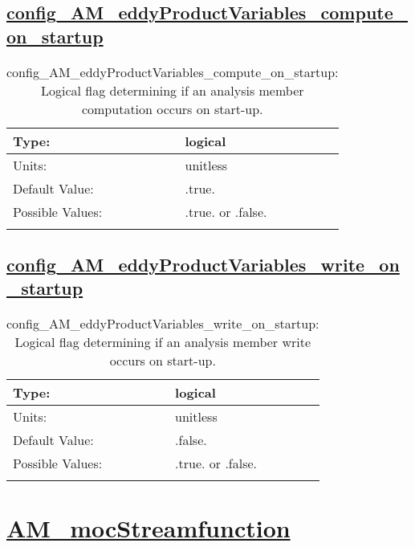 \subsection[config\_AM\_eddyProductVariables\_compute\_on\_startup]{\hyperref[sec:nm_tab_AM_eddyProductVariables]{config\_AM\_eddyProductVariables\_compute\_on\_startup}}
\label{subsec:nm_sec_config_AM_eddyProductVariables_compute_on_startup}
\begin{center}
\begin{longtable}{| p{2.0in} || p{4.0in} |}
    \hline
    Type: & logical \\
    \hline
    Units: & \si{unitless} \\
    \hline
    Default Value: & .true. \\
    \hline
    Possible Values: & .true. or .false. \\
    \hline
    \caption{config\_AM\_eddyProductVariables\_compute\_on\_startup: Logical flag determining if an analysis member computation occurs on start-up.}
\end{longtable}
\end{center}
\subsection[config\_AM\_eddyProductVariables\_write\_on\_startup]{\hyperref[sec:nm_tab_AM_eddyProductVariables]{config\_AM\_eddyProductVariables\_write\_on\_startup}}
\label{subsec:nm_sec_config_AM_eddyProductVariables_write_on_startup}
\begin{center}
\begin{longtable}{| p{2.0in} || p{4.0in} |}
    \hline
    Type: & logical \\
    \hline
    Units: & \si{unitless} \\
    \hline
    Default Value: & .false. \\
    \hline
    Possible Values: & .true. or .false. \\
    \hline
    \caption{config\_AM\_eddyProductVariables\_write\_on\_startup: Logical flag determining if an analysis member write occurs on start-up.}
\end{longtable}
\end{center}
\section[AM\_mocStreamfunction]{\hyperref[sec:nm_tab_AM_mocStreamfunction]{AM\_mocStreamfunction}}
\label{sec:nm_sec_AM_mocStreamfunction}
